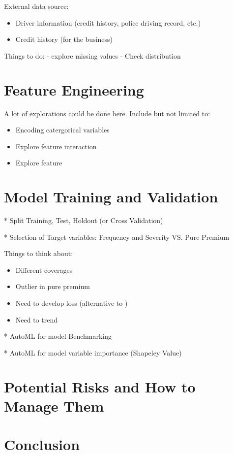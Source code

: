 \documentclass{article}
\begin{document}
External data source:
\begin{itemize}
    \item Driver information (credit history, police driving record, etc.)
    \item Credit history (for the business)
\end{itemize}

Things to do:
- explore missing values
- Check distribution


\section{Feature Engineering}

A lot of explorations could be done here. Include but not limited to:
\begin{itemize}
    \item Encoding catergorical variables
    \item Explore feature interaction
    \item Explore feature
\end{itemize}



\section{Model Training and Validation}

* Split Training, Test, Holdout (or Cross Validation)

* Selection of Target variables: Frequency and Severity VS. Pure Premium

Things to think about:
\begin{itemize}
    \item Different coverages
    \item Outlier in pure premium
    \item Need to develop loss (alternative to )
    \item Need to trend
\end{itemize}

* AutoML for model Benchmarking

* AutoML for model variable importance (Shapeley Value)


\section{Potential Risks and How to Manage Them}



\section{Conclusion}



\end{document}
